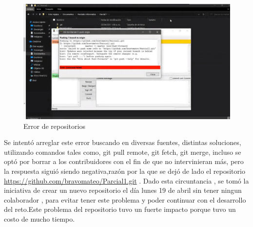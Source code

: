 \documentclass{article}
\begin{document}
    \begin{figure}[h]
    \includegraphics[width=15cm]{Error1.jpeg}
    \centering
    \caption{Error de repositorios}
    \label{repoerror}
    \end{figure}
    
Se intentó arreglar este error buscando en diversas fuentes, distintas soluciones, utilizando comandos tales como, git pull remote, git fetch, git merge, incluso se optó por borrar a los contribuidores con el fin de que no intervinieran más, pero la respuesta siguió siendo negativa,razón por la que se dejó de lado el repositorio\\ \url{https://github.com/bravomateo/Parcial1.git} . Dado esta circuntancia , se tomó la iniciativa de crear un nuevo repositorio el día lunes 19 de abril sin tener ningun colaborador , para evitar tener este problema y poder continuar con el desarrollo del reto.Este problema del repositorio tuvo un fuerte impacto porque tuvo un costo de mucho tiempo.\\






\end{document}
